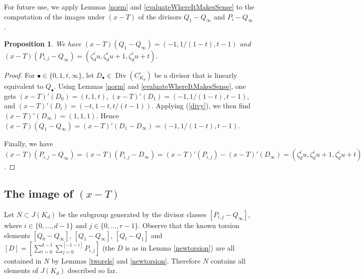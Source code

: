 \documentclass[reqno]{amsart}
\newtheorem{proposition}[thm]{Proposition}
\theoremstyle{definition}
\theoremstyle{remark}
\newcommand{\Div}{\operatorname{Div}}
\newcommand{\XminusT}{(x-T)}
\newcommand{\xminusT}{(x-T)'}
\begin{document}
For future use, we apply Lemmas \ref{norm} and \ref{evaluateWhereItMakesSense} to the computation of the images under $\XminusT$ of the divisors $Q_1-Q_\infty$ and $P_i - Q_\infty$.

\begin{proposition}
\label{computation}
We have $\XminusT(Q_1-Q_\infty)=(-1,1/(1-t),t-1)$ and $\XminusT(P_{i,j}-Q_\infty) = (\zeta_d^i u,\zeta_d^i u + 1,\zeta_d^i u + t)$.
\end{proposition}
\begin{proof}
For $\bullet \in \{ 0,1,t, \infty \}$, let $D_\bullet \in \Div(C_{K_d}^\circ)$ be a divisor that is linearly equivalent to $Q_\bullet$. Using Lemmas \ref{norm} and \ref{evaluateWhereItMakesSense}, one gets $\xminusT(D_0)=(t,1,t)$, $\xminusT(D_1)=(-1,1/(1-t),t-1)$, and $\xminusT(D_t)= (-t,1-t,t/(t-1))$. Applying (\ref{divy}), we then find $\xminusT(D_\infty) = (1,1,1)$. Hence $\XminusT(Q_1-Q_\infty)=\xminusT(D_1-D_\infty)=(-1,1/(1-t),t-1)$.

Finally, we have $\XminusT(P_{i,j} - Q_\infty) = \XminusT(P_{i,j} - D_\infty) = \xminusT(P_{i,j}) - \xminusT(D_\infty) = (\zeta_d^i u,\zeta_d^i u + 1,\zeta_d^i u + t)$.
\end{proof}

\subsection{The image of $\XminusT$}

Let $N \subset J(K_d)$ be the subgroup generated by the divisor classes $[P_{i,j} - Q_\infty]$, where $i \in \{0,\ldots,d-1\}$ and $j \in \{0,\ldots,r-1\}$. Observe that the known torsion elements $[Q_0 - Q_\infty]$, $[Q_1 - Q_\infty]$, $[Q_t - Q_1]$ and $[D] = [\sum_{i=0}^{d-1} \sum_{j=0}^{[-1-i]} P_{i,j}]$ (the $D$ is as in Lemma \ref{newtorsion}) are all contained in $N$ by Lemmas \ref{tworels} and \ref{newtorsion}. Therefore $N$ contains all elements of $J(K_d)$ described so far. 
\end{document}
